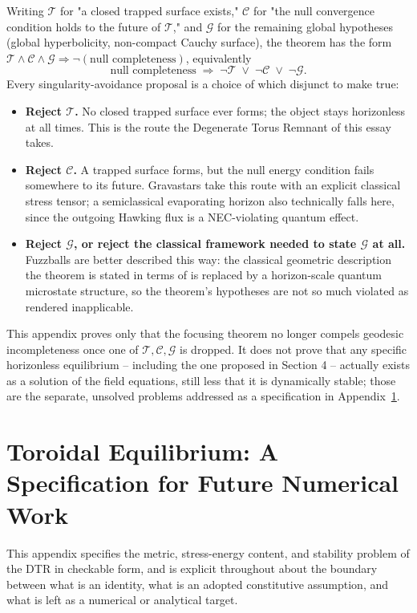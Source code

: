 \documentclass[11pt]{article}
\begin{document}
Writing $\mathcal{T}$ for "a closed trapped surface exists," $\mathcal{C}$ for "the null convergence condition holds to the future of $\mathcal{T}$," and $\mathcal{G}$ for the remaining global hypotheses (global hyperbolicity, non-compact Cauchy surface), the theorem has the form $\mathcal{T}\wedge\mathcal{C}\wedge\mathcal{G} \Rightarrow \neg(\text{null completeness})$, equivalently
\begin{equation}
\text{null completeness} \;\Longrightarrow\; \neg\mathcal{T} \;\lor\; \neg\mathcal{C} \;\lor\; \neg\mathcal{G}.
\end{equation}
Every singularity-avoidance proposal is a choice of which disjunct to make true:
\begin{itemize}
\item \textbf{Reject $\mathcal{T}$.} No closed trapped surface ever forms; the object stays horizonless at all times. This is the route the Degenerate Torus Remnant of this essay takes.
\item \textbf{Reject $\mathcal{C}$.} A trapped surface forms, but the null energy condition fails somewhere to its future. Gravastars take this route with an explicit classical stress tensor; a semiclassical evaporating horizon also technically falls here, since the outgoing Hawking flux is a NEC-violating quantum effect.
\item \textbf{Reject $\mathcal{G}$, or reject the classical framework needed to state $\mathcal{G}$ at all.} Fuzzballs are better described this way: the classical geometric description the theorem is stated in terms of is replaced by a horizon-scale quantum microstate structure, so the theorem's hypotheses are not so much violated as rendered inapplicable.
\end{itemize}
This appendix proves only that the focusing theorem no longer compels geodesic incompleteness once one of $\mathcal{T},\mathcal{C},\mathcal{G}$ is dropped. It does not prove that any specific horizonless equilibrium -- including the one proposed in Section 4 -- actually exists as a solution of the field equations, still less that it is dynamically stable; those are the separate, unsolved problems addressed as a specification in Appendix~\ref{app:toroidal}.

\section{Toroidal Equilibrium: A Specification for Future Numerical Work}
\label{app:toroidal}

This appendix specifies the metric, stress-energy content, and stability problem of the DTR in checkable form, and is explicit throughout about the boundary between what is an identity, what is an adopted constitutive assumption, and what is left as a numerical or analytical target.
\end{document}
